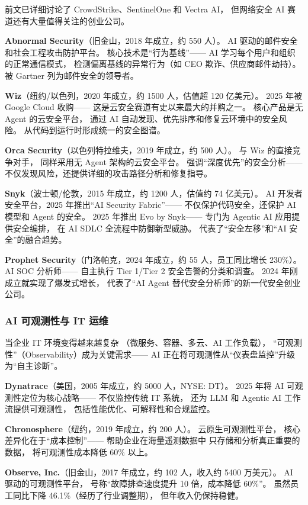 前文已详细讨论了 CrowdStrike、SentinelOne 和 Vectra AI，
但网络安全 AI 赛道还有大量值得关注的创业公司。

\textbf{Abnormal Security}（旧金山，2018 年成立，约 550 人）。
AI 驱动的邮件安全和社会工程攻击防护平台。
核心技术是``行为基线''——
AI 学习每个用户和组织的正常通信模式，
检测偏离基线的异常行为（如 CEO 欺诈、供应商邮件劫持）。
被 Gartner 列为邮件安全的领导者。

\textbf{Wiz}（纽约/以色列，2020 年成立，约 1500 人，估值超 120 亿美元）。
2025 年被 Google Cloud 收购——
这是云安全赛道有史以来最大的并购之一。
核心产品是无 Agent 的云安全平台，
通过 AI 自动发现、优先排序和修复云环境中的安全风险。
从代码到运行时形成统一的安全图谱。

\textbf{Orca Security}（以色列特拉维夫，2019 年成立，约 500 人）。
与 Wiz 的直接竞争对手，
同样采用无 Agent 架构的云安全平台。
强调``深度优先''的安全分析——
不仅发现风险，还提供详细的攻击路径分析和修复指导。

\textbf{Snyk}（波士顿/伦敦，2015 年成立，约 1200 人，估值约 74 亿美元）。
AI 开发者安全平台，2025 年推出``AI Security Fabric''——
不仅保护代码安全，还保护 AI 模型和 Agent 的安全。
2025 年推出 Evo by Snyk——
专门为 Agentic AI 应用提供安全编排，
在 AI SDLC 全流程中防御新型威胁。
代表了``安全左移''和``AI 安全''的融合趋势。

\textbf{Prophet Security}（门洛帕克，2024 年成立，约 55 人，员工同比增长 230\%）。
AI SOC 分析师——
自主执行 Tier 1/Tier 2 安全告警的分类和调查。
2024 年刚成立就实现了爆发式增长，
代表了``AI Agent 替代安全分析师''的新一代安全创业公司。

\subsubsection{AI 可观测性与 IT 运维}

当企业 IT 环境变得越来越复杂
（微服务、容器、多云、AI 工作负载），
``可观测性''（Observability）成为关键需求——
AI 正在将可观测性从``仪表盘监控''升级为``自主诊断''。

\textbf{Dynatrace}（美国，2005 年成立，约 5000 人，NYSE: DT）。
2025 年将 AI 可观测性定位为核心战略——
不仅监控传统 IT 系统，
还为 LLM 和 Agentic AI 工作流提供可观测性，
包括性能优化、可解释性和合规监控。

\textbf{Chronosphere}（纽约，2019 年成立，约 200 人）。
云原生可观测性平台，
核心差异化在于``成本控制''——
帮助企业在海量遥测数据中
只存储和分析真正重要的数据，
将可观测性成本降低 60\% 以上。

\textbf{Observe, Inc.}（旧金山，2017 年成立，约 102 人，收入约 5400 万美元）。
AI 驱动的可观测性平台，
号称``故障排查速度提升 10 倍，成本降低 60\%''。
虽然员工同比下降 46.1\%（经历了行业调整期），
但年收入仍保持稳健。

